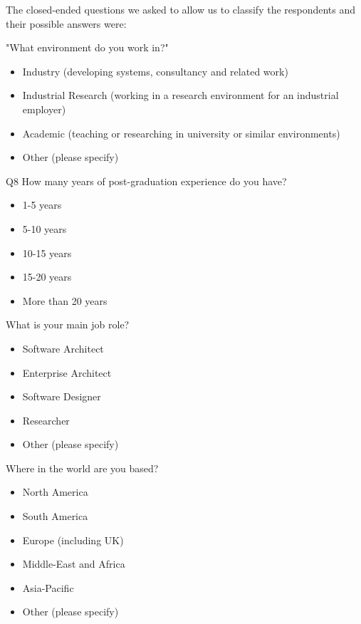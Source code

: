 The closed-ended questions we asked to allow us to classify the respondents and their possible answers were:

\begin{description}
	\item [Q7] "What environment do you work in?"
	\begin{itemize}
		\item Industry (developing systems, consultancy and related work)
		\item Industrial Research (working in a research environment for an industrial employer) 
		\item Academic (teaching or researching in university or similar environments)
		\item Other (please specify)
	\end{itemize}
	\begin{minipage}{\textwidth} %
	\item [Q8] How many years of post-graduation experience do you have? \nolinebreak
	\begin{itemize}
		\item 1-5 years
		\item 5-10 years
		\item 10-15 years
		\item 15-20 years
		\item More than 20 years
    \end{itemize}
    \end{minipage}
    \vspace{1pt} %
	\item [Q9] What is your main job role? \nolinebreak
	\begin{itemize}
		\item Software Architect
		\item Enterprise Architect
		\item Software Designer
		\item Researcher
		\item Other (please specify)
    \end{itemize}
	\item [Q10] Where in the world are you based?
	\begin{itemize}
		\item North America
		\item South America 
		\item Europe (including UK) 
		\item Middle-East and Africa 
		\item Asia-Pacific
		\item Other (please specify)
	\end{itemize}
\end{description}

